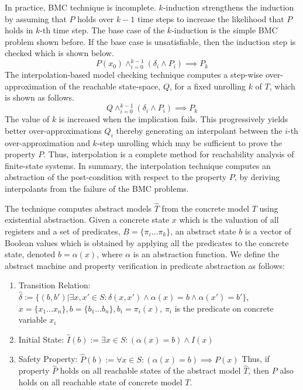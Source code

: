 %
In practice, BMC technique is incomplete. $k$-induction 
strengthens the induction by assuming that $P$ holds 
over $k-1$ time steps to increase the likelihood that $P$
holds in $k$-th time step. The base case of the $k$-induction is the
simple BMC problem shown before. If the base case is unsatisfiable,
then the induction step is checked which is shown below.
%
\[ P(x_0) \wedge_{i=0}^{k-1} (\delta_i \wedge P_i) \implies P_k \]
%
%
The interpolation-based model checking technique
computes a step-wise over-approximation of the reachable state-space,
$Q$, for a fixed unrolling $k$ of $T$, which is shown as
follows.
%
\[ Q \wedge_{i=0}^{k-1} (\delta_i \wedge P_i) \implies P_k \]
%
The value of $k$ is increased when the implication fails. This
progressively yields better over-approximations $Q_i$ thereby
generating an interpolant between the $i$-th over-approximation and
$k$-step unrolling which may be sufficient to prove the property
$P$. Thus, interpolation is a complete method for reachability
analysis of finite-state systems. In summary, the interpolation
technique computes an abstraction of the post-condition with respect
to the property $P$, by deriving interpolants from the failure of the
BMC problems.

%
The technique computes abstract models $\hat{T}$ from the concrete model
$T$ using existential abstraction. Given a concrete state $x$ which is the 
valuation of all registers and a set of predicates, $B=\{\pi_{i} \ldots \pi_{k}\}$, 
an abstract state $b$ is a vector of Boolean values which is obtained by applying 
all the predicates to the concrete state, denoted $b=\alpha(x)$, where $\alpha$
is an abstraction function. We define the abstract machine and property verification
in predicate abstraction as follows:
\begin{enumerate}
\item Transition Relation: $ \hat{\delta} := \{(b,b') | \exists x,x' \in S: \delta(x,x') 
\wedge \alpha(x) = b \wedge \alpha(x') = b' \} $, $x=\{x_1 \ldots x_n\}, 
b=\{b_1 \ldots b_n\}, b_i=\pi_{i}(x) $, $\pi_i$ is the predicate on concrete 
variable $x_i$

\item Initial State: $\hat{I}(b) := \exists x \in S: (\alpha(x) = b) \wedge I(x)$

\item Safety Property: $\hat{P}(b) := \forall x \in S: (\alpha(x) = b) \implies P(x)$ 
Thus, if property $\hat{P}$ holds on all reachable states of the abstract model $\hat{T}$,
then $P$ also holds on all reachable state of concrete model $T$.
\end{enumerate}

